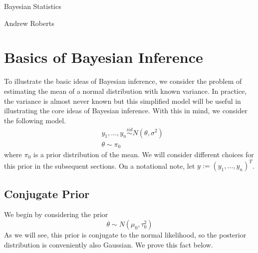 \documentclass[12pt]{article}
\begin{document}
\begin{center}
\Large
Bayesian Statistics
\end{center}

\begin{flushright}
Andrew Roberts
\end{flushright} 

\section{Basics of Bayesian Inference}
To illustrate the basic ideas of Bayesian inference, we consider the problem of estimating the mean of a normal distribution with known variance. In practice, the variance is almost never known
but this simplified model will be useful in illustrating the core ideas of Bayesian inference. With this in mind, we consider the following model. 
\begin{align*}
&y_1, \dots, y_n \overset{iid}{\sim} N(\theta, \sigma^2) \\
&\theta \sim \pi_0
\end{align*}
where $\pi_0$ is a prior distribution of the mean. We will consider different choices for this prior in the subsequent sections. On a notational note, let $y := (y_1, \dots, y_n)^T$. 

\subsection{Conjugate Prior}
We begin by considering the prior 
\[\theta \sim N(\mu_0, \tau_0^2)\]
As we will see, this prior is conjugate to the normal likelihood, so the posterior distribution is conveniently also Gaussian. We prove this fact below.
\end{document}
